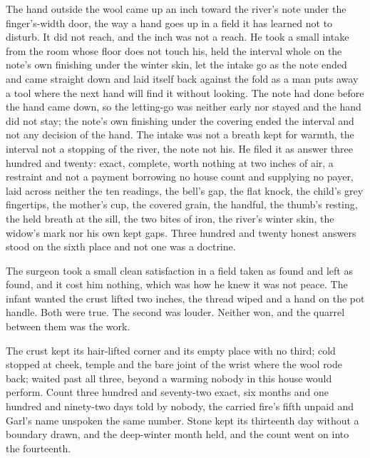 The hand outside the wool came up an inch toward the river's note under the finger's-width door, the way a hand goes up in a field it has learned not to disturb. It did not reach, and the inch was not a reach. He took a small intake from the room whose floor does not touch his, held the interval whole on the note's own finishing under the winter skin, let the intake go as the note ended and came straight down and laid itself back against the fold as a man puts away a tool where the next hand will find it without looking. The note had done before the hand came down, so the letting-go was neither early nor stayed and the hand did not stay; the note's own finishing under the covering ended the interval and not any decision of the hand. The intake was not a breath kept for warmth, the interval not a stopping of the river, the note not his. He filed it as answer three hundred and twenty: exact, complete, worth nothing at two inches of air, a restraint and not a payment borrowing no house count and supplying no payer, laid across neither the ten readings, the bell's gap, the flat knock, the child's grey fingertips, the mother's cup, the covered grain, the handful, the thumb's resting, the held breath at the sill, the two bites of iron, the river's winter skin, the widow's mark nor his own kept gaps. Three hundred and twenty honest answers stood on the sixth place and not one was a doctrine.

The surgeon took a small clean satisfaction in a field taken as found and left as found, and it cost him nothing, which was how he knew it was not peace. The infant wanted the crust lifted two inches, the thread wiped and a hand on the pot handle. Both were true. The second was louder. Neither won, and the quarrel between them was the work.

The crust kept its hair-lifted corner and its empty place with no third; cold stopped at cheek, temple and the bare joint of the wrist where the wool rode back;  waited past all three, beyond a warming nobody in this house would perform. Count three hundred and seventy-two exact, six months and one hundred and ninety-two days told by nobody, the carried fire's fifth unpaid and Garl's name unspoken the same number. Stone kept its thirteenth day without a boundary drawn, and the deep-winter month held, and the count went on into the fourteenth.
